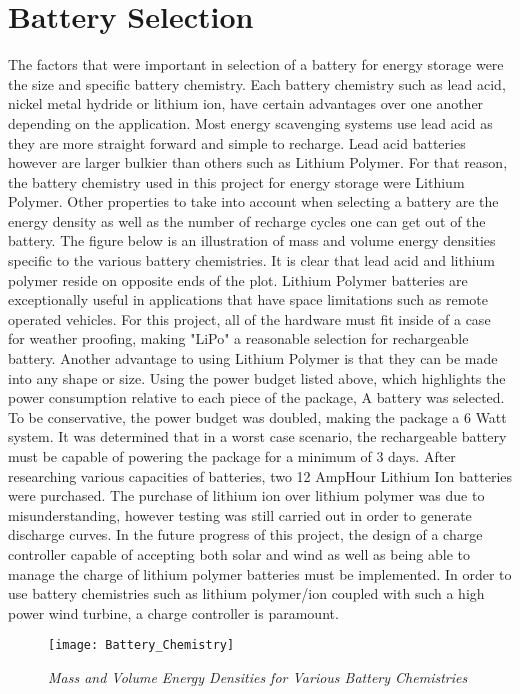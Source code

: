 \section{Battery Selection}
\indent The factors that were important in selection of a battery for energy storage were the size and specific battery chemistry. Each battery chemistry such as lead acid, nickel metal hydride or lithium ion, have certain advantages over one another depending on the application. Most energy scavenging systems use lead acid as they are more straight forward and simple to recharge. Lead acid batteries  however are larger bulkier than others such as Lithium Polymer. For that reason, the battery chemistry used in this project for energy storage were Lithium Polymer.  Other properties to take into account when selecting a battery are the energy density as well as the number of recharge cycles one can get out of the battery. The figure below is an illustration of mass and volume energy densities specific to the various battery chemistries. It is clear that lead acid and lithium polymer reside on opposite ends of the plot. 
\indent Lithium Polymer batteries are exceptionally useful in applications that have space limitations such as remote operated vehicles. For this project, all of the hardware must fit inside of a case for weather proofing, making "LiPo" a reasonable selection for rechargeable battery. Another advantage to using Lithium Polymer is that they can be made into any shape or size. 
\indent Using the power budget listed above, which highlights the power consumption relative to each piece of the package, A battery was selected. To be conservative, the power budget was doubled, making the package a 6 Watt system. It was determined that in a worst case scenario, the rechargeable battery must be capable of powering the package for a minimum of 3 days. After researching various capacities of batteries, two 12 AmpHour Lithium Ion batteries were purchased. The purchase of lithium ion over lithium polymer was due to misunderstanding, however testing was still carried out in order to generate discharge curves. In the future progress of this project, the design of a charge controller capable of accepting both solar and wind as well as being able to manage the charge of lithium polymer batteries must be implemented. In order to use battery chemistries such as lithium polymer/ion coupled with such a high power wind turbine, a charge controller is paramount. 

\begin{figure}
\centering
\texttt{[image: Battery\_Chemistry]}
\caption{\textit{Mass and Volume Energy Densities for Various Battery Chemistries}}
\label{fig:Battery_Chemistry}
\end{figure}
